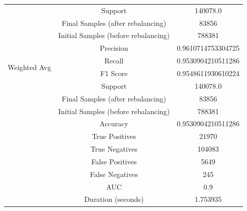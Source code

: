 \begin{longtable}{|c|c|c|}
 & Support & 140078.0 \\
 & Final Samples (after rebalancing) & 83856 \\
 & Initial Samples (before rebalancing) & 788381 \\
\hline
\multirow{4}{*}{Weighted Avg} & Precision & 0.9610714753304725 \\
 & Recall & 0.9530904210511286 \\
 & F1 Score & 0.9548611930610224 \\
 & Support & 140078.0 \\
 & Final Samples (after rebalancing) & 83856 \\
 & Initial Samples (before rebalancing) & 788381 \\
\hline
& Accuracy & 0.9530904210511286 \\ \hline
& True Positives & 21970 \\ \hline
& True Negatives & 104083 \\ \hline
& False Positives & 5649 \\ \hline
& False Negatives & 245 \\ \hline
& AUC & 0.9 \\ \hline
& Duration (seconds) & 1.753935 \\ \hline
\end{longtable}


